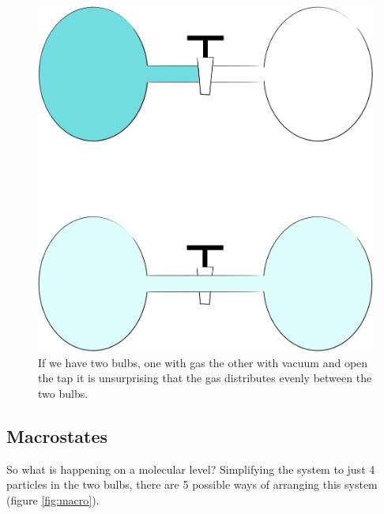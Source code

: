 \documentclass[
]{book}
\begin{document}
\begin{figure}

{\centering \includegraphics[width=0.5\linewidth]{images/gasdistribution} 

}

\caption{If we have two bulbs, one with gas the other with vacuum and open the tap it is unsurprising that the gas distributes evenly between the two bulbs.}\label{fig:gasdistribution}
\end{figure}

\hypertarget{macrostates}{%
\subsection{Macrostates}\label{macrostates}}

So what is happening on a molecular level? Simplifying the system to just 4 particles in the two bulbs, there are 5 possible ways of arranging this system (figure \ref{fig:macro}).
\end{document}
